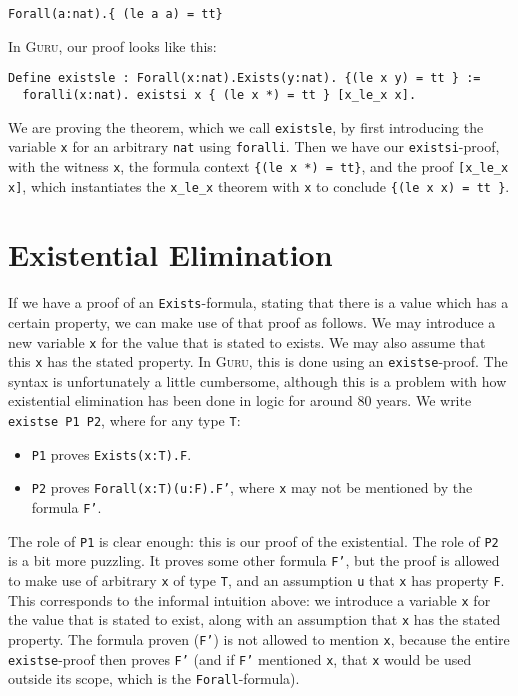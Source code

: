 \documentclass{book}[12pt]
\newcommand{\guru}[0]{\textsc{Guru}\xspace}
\begin{document}
\begin{verbatim}
Forall(a:nat).{ (le a a) = tt}
\end{verbatim}

In \guru, our proof looks like this:

\begin{verbatim}
Define existsle : Forall(x:nat).Exists(y:nat). {(le x y) = tt } :=
  foralli(x:nat). existsi x { (le x *) = tt } [x_le_x x].
\end{verbatim}

\noindent We are proving the theorem, which we call \texttt{existsle},
by first introducing the variable \texttt{x} for an arbitrary
\texttt{nat} using \texttt{foralli}.  Then we have our
\texttt{existsi}-proof, with the witness \texttt{x}, the formula
context \texttt{\{(le x *) = tt\}}, and the proof \texttt{[x\_le\_x x]},
which instantiates the \texttt{x\_le\_x} theorem with \texttt{x} to
conclude \texttt{\{(le x x) = tt \}}.

\section{Existential Elimination}

If we have a proof of an \texttt{Exists}-formula, stating that there
is a value which has a certain property, we can make use of that proof
as follows.  We may introduce a new variable \texttt{x} for the value
that is stated to exists.  We may also assume that this \texttt{x} has
the stated property.  In \guru, this is done using an
\texttt{existse}-proof.  The syntax is unfortunately a little
cumbersome, although this is a problem with how existential
elimination has been done in logic for around 80 years.  We write
\texttt{existse P1 P2}, where for any type \texttt{T}:

\begin{itemize}
\item \texttt{P1} proves \texttt{Exists(x:T).F}.
\item \texttt{P2} proves \texttt{Forall(x:T)(u:F).F'}, where
\texttt{x} may not be mentioned by the formula \texttt{F'}.
\end{itemize}

\noindent The role of \texttt{P1} is clear enough: this is our proof
of the existential.  The role of \texttt{P2} is a bit more puzzling.
It proves some other formula \texttt{F'}, but the proof is allowed to
make use of arbitrary \texttt{x} of type \texttt{T}, and an assumption
\texttt{u} that \texttt{x} has property \texttt{F}.  This corresponds
to the informal intuition above: we introduce a variable \texttt{x}
for the value that is stated to exist, along with an assumption that
\texttt{x} has the stated property.  The formula proven (\texttt{F'})
is not allowed to mention \texttt{x}, because the entire
\texttt{existse}-proof then proves \texttt{F'} (and if \texttt{F'}
mentioned \texttt{x}, that \texttt{x} would be used outside its scope,
which is the \texttt{Forall}-formula).
\end{document}
